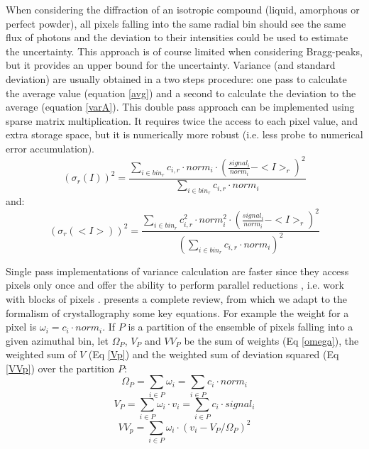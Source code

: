 \documentclass[preprint]{iucr}              %
\begin{document}
When considering the diffraction of an isotropic compound (liquid, amorphous or perfect powder), all pixels falling into the same radial bin should see the same flux of photons and the deviation to their intensities could be used to estimate the uncertainty. 
This approach is of course limited when considering Bragg-peaks, but it provides an upper bound for the uncertainty.
Variance (and standard deviation) are usually obtained in a two steps procedure: one pass to calculate the average value (equation \ref{avg}) and a second to calculate the deviation to the average (equation \ref{varA}). 
This double pass approach can be implemented using sparse matrix multiplication. 
It requires twice the access to each pixel value, and extra storage space, but it is numerically more robust (i.e. less probe to numerical error accumulation).
\begin{equation}
\label{varA}
    (\sigma_{r}(I))^2 = \frac {\sum\limits_{i \in bin_r} c_{i,r} \cdot norm_i \cdot (\frac{signal_i}{norm_i}-<I>_r)^2}
                              {\sum\limits_{i \in bin_r} c_{i,r} \cdot norm_i}
\end{equation}
and:
\begin{equation}
\label{varB}
(\sigma_{r}(<I>))^2 = \frac{\sum\limits_{i \in bin_r} c_{i,r}^2 \cdot norm_i^2 \cdot (\frac{signal_i}{norm_i}-<I>_r)^2}
                         {(\sum\limits_{i \in bin_r} c_{i,r} \cdot norm_i)^2}  
\end{equation}


Single pass implementations of variance calculation are faster since they access pixels only once and offer the ability to perform parallel reductions \cite{Blelloch}, i.e. work with blocks of pixels .
 presents a complete review, from which we adapt to the formalism of crystallography some key equations.
For example the weight for a pixel is $\omega_i = c_i \cdot norm_i$.
If $P$ is a partition of the ensemble of pixels falling into a given azimuthal bin, let $\Omega_{P}$, $V_{P}$ and $VV_{P}$  
be the sum of weights (Eq \ref{omega}), the weighted sum of $V$ (Eq \ref{Vp}) and the weighted sum of deviation squared (Eq \ref{VVp}) over the partition $P$: 
\begin{equation}
\label{omega}
\Omega_{P} = \sum\limits_{i \in P} \omega_i = \sum\limits_{i \in P} c_i \cdot norm_i 
\end{equation}
\begin{equation}
\label{Vp}
V_{P} = \sum\limits_{i \in P} \omega_i \cdot v_i =  \sum\limits_{i \in P} c_i \cdot signal_i
\end{equation}
\begin{equation}
\label{VVp}
VV_{p} = \sum\limits_{i \in P} \omega_i \cdot (v_i - V_{P}/\Omega_{P})^2 
\end{equation}
\end{document}
